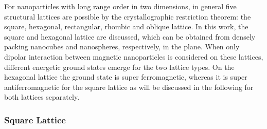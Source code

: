 \documentclass[\main/dresen_thesis.tex]{subfiles}
\begin{document}
  For nanoparticles with long range order in two dimensions, in general five structural lattices are possible by the crystallographic restriction theorem: the square, hexagonal, rectangular, rhombic and oblique lattice.
  In this work, the square and hexagonal lattice are discussed, which can be obtained from densely packing nanocubes and nanospheres, respectively, in the plane.
  When only dipolar interaction between magnetic nanoparticles is considered on these lattices, different energetic ground states emerge for the two lattice types.
  On the hexagonal lattice the ground state is super ferromagnetic, whereas it is super antiferromagnetic for the square lattice as will be discussed in the following for both lattices separately.


  \subsubsection{Square Lattice}
\end{document}
